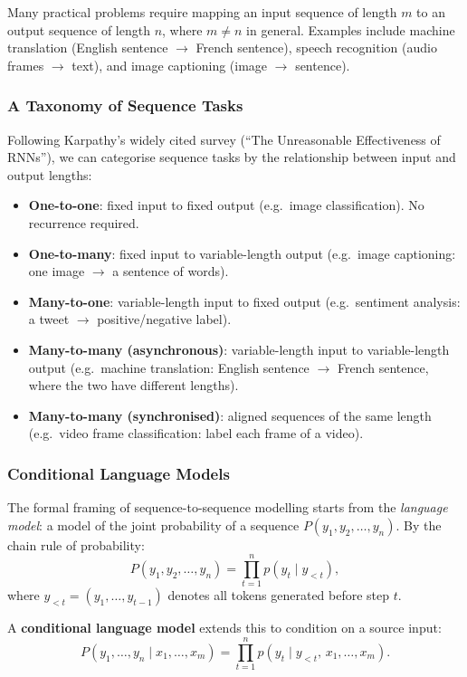 \documentclass[11pt,a4paper]{article}
\newcommand{\term}[1]{\textcolor{DefGreen}{\textbf{#1}}}
\begin{document}
Many practical problems require mapping an input sequence of length $m$ to an output sequence of length $n$, where $m \neq n$ in general. Examples include machine translation (English sentence $\to$ French sentence), speech recognition (audio frames $\to$ text), and image captioning (image $\to$ sentence).

\subsubsection{A Taxonomy of Sequence Tasks}

Following Karpathy's widely cited survey (``The Unreasonable Effectiveness of RNNs''), we can categorise sequence tasks by the relationship between input and output lengths:

\begin{itemize}
  \item \textbf{One-to-one}: fixed input to fixed output (e.g.\ image classification). No recurrence required.
  \item \textbf{One-to-many}: fixed input to variable-length output (e.g.\ image captioning: one image $\to$ a sentence of words).
  \item \textbf{Many-to-one}: variable-length input to fixed output (e.g.\ sentiment analysis: a tweet $\to$ positive/negative label).
  \item \textbf{Many-to-many (asynchronous)}: variable-length input to variable-length output (e.g.\ machine translation: English sentence $\to$ French sentence, where the two have different lengths).
  \item \textbf{Many-to-many (synchronised)}: aligned sequences of the same length (e.g.\ video frame classification: label each frame of a video).
\end{itemize}

\subsubsection{Conditional Language Models}

The formal framing of sequence-to-sequence modelling starts from the \emph{language model}: a model of the joint probability of a sequence $P(y_1, y_2, \ldots, y_n)$. By the chain rule of probability:
\[
  P(y_1, y_2, \ldots, y_n) = \prod_{t=1}^{n} p(y_t \mid y_{<t}),
\]
where $y_{<t} = (y_1, \ldots, y_{t-1})$ denotes all tokens generated before step $t$.

A \term{conditional language model} extends this to condition on a source input:
\[
  P(y_1, \ldots, y_n \mid x_1, \ldots, x_m) = \prod_{t=1}^{n} p(y_t \mid y_{<t},\, x_1, \ldots, x_m).
\]
\end{document}
